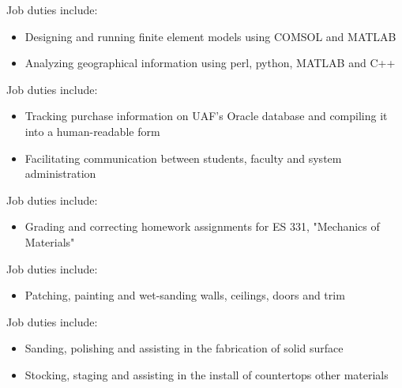 \documentclass{resume}
\begin{document}
    \normalsize
    Job duties include:
    \small
    \begin{itemize}
        \item Designing and running finite element models using COMSOL and MATLAB
        \item Analyzing geographical information using perl, python, MATLAB and C++
    \end{itemize}
    \normalsize
    \medskip
    
    \normalsize
    Job duties include:
    \small
    \begin{itemize}
        \item Tracking purchase information on UAF's Oracle database and compiling it into a human-readable form
        \item Facilitating communication between students, faculty and system administration
    \end{itemize}
    \normalsize
    \medskip
    
    \normalsize
    Job duties include:
    \small
    \begin{itemize}
        \item Grading and correcting homework assignments for ES 331, "Mechanics of Materials"
    \end{itemize}\normalsize
    \medskip
    
    \normalsize
    Job duties include:
    \small\begin{itemize}
        \item Patching, painting and wet-sanding walls, ceilings, doors and trim
    \end{itemize}
    \normalsize
    \medskip
    
    \normalsize
    Job duties include:
    \small
    \begin{itemize}
        \item Sanding, polishing and assisting in the fabrication of solid surface
        \item Stocking, staging and assisting in the install of countertops other materials
    \end{itemize}
    \normalsize
    \medskip
    
\end{document}
